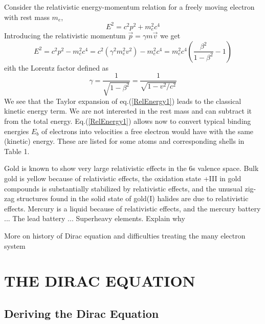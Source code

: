 \documentclass[12pt]{article}
\begin{document}
Consider the relativistic energy-momentum relation for a freely moving electron with rest mass $m_e$,
\begin{equation}
   E^2 = c^2p^2 + m_e^2c^4
   \label{RelEnergy}
\end{equation}
Introducing the relativistic momentum $\vec{p}=\gamma m\vec{v}$ we get
\begin{equation}
   E^2  = c^2p^2 - m_e^2c^4 = c^2\left(\gamma^2m_e^2v^2\right) - m_e^2c^4 = m_e^2c^4  \left(\frac{\beta^2}{1-\beta^2} - 1\right)
   \label{RelEnergy1}
\end{equation}
eith the Lorentz factor defined as
\begin{equation}
   \gamma = \frac{1}{\sqrt{1-\beta^2}} = \frac{1}{\sqrt{1-v^2/c^2}}
   \label{Lorentzfactor}
\end{equation}
We see that the Taylor expansion of eq.(\ref{RelEnergy1}) leads to the classical kinetic energy term. We are not interested in the rest mass and can subtract it from the total energy. Eq.(\ref{RelEnergy1}) allows now to convert typical binding energies $E_b$ of electrons into velocities a free electron would have with the same (kinetic) energy. These are listed for some atoms and corresponding shells in Table 1.

Gold is known to show very large relativistic effects in the 6s valence space.\cite{Pyykko-1988,pyykko-2012relativistic} Bulk gold is yellow because of relativistic effects, the oxidation state +III in gold compounds is substantially stabilized by relativistic effects, and the unusual zig-zag structures found in the solid state of gold(I) halides are due to relativistic effects. Mercury is a liquid because of relativistic effects, and the mercury battery ... The lead battery ... Superheavy elements.
Explain why

More on history of Dirac equation and difficulties treating the many electron system

\section{\label{DiracEquation}\sffamily \Large THE DIRAC EQUATION} 

\subsection{\sffamily Deriving the Dirac Equation}
\end{document}

